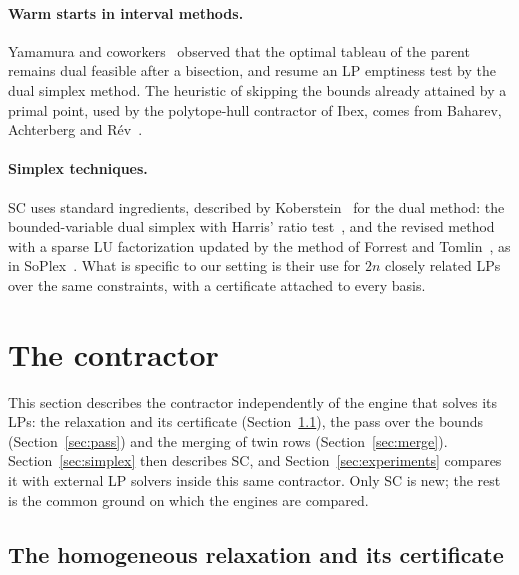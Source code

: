 \documentclass[11pt]{article}
\theoremstyle{definition}
\theoremstyle{remark}
\begin{document}
\paragraph{Warm starts in interval methods.}
Yamamura and coworkers~\cite{yamamura2001dual,yamamura2006dual} observed that
the optimal tableau of the parent remains dual feasible after a bisection, and
resume an LP emptiness test by the dual simplex method. The heuristic of
skipping the bounds already attained by a primal point, used by the
polytope-hull contractor of Ibex, comes from Baharev, Achterberg and
R\'ev~\cite{baharev2009distillation}.

\paragraph{Simplex techniques.}
SC uses standard ingredients, described by Koberstein~\cite{koberstein2005dual}
for the dual method: the bounded-variable dual simplex with Harris' ratio
test~\cite{harris1973devex}, and the revised method with a sparse LU
factorization updated by the method of Forrest and
Tomlin~\cite{forrest1972updated}, as in SoPlex~\cite{wunderling1996paralleler}.
What is specific to our setting is their use for $2n$ closely related LPs over
the same constraints, with a certificate attached to every basis.

\section{The contractor}\label{sec:contractor}

This section describes the contractor independently of the engine that
solves its LPs: the relaxation and its certificate
(Section~\ref{sec:dfb}), the pass over the bounds
(Section~\ref{sec:pass}) and the merging of twin rows
(Section~\ref{sec:merge}). Section~\ref{sec:simplex} then describes SC, and
Section~\ref{sec:experiments} compares it with external LP solvers inside this
same contractor. Only SC is new; the rest is the common ground on which the
engines are compared.

\subsection{The homogeneous relaxation and its certificate}\label{sec:dfb}
\end{document}
